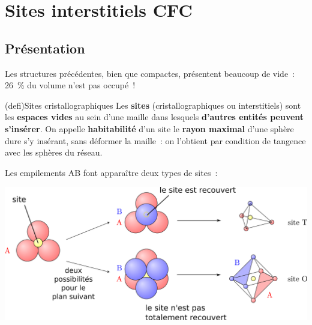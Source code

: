 \documentclass[../../main/main.tex]{subfiles}
\begin{document}
\section{Sites interstitiels CFC}
\subsection{Présentation}
Les structures précédentes, bien que compactes, présentent beaucoup de vide~:
\SI{26}{\%} du volume n'est pas occupé~!
\begin{tcb*}(defi){Sites cristallographiques}
	Les \textbf{sites} (cristallographiques ou interstitiels) sont les
	\textbf{espaces vides} au sein d'une maille dans lesquels \textbf{d'autres
		entités peuvent s'insérer}.
	\smallbreak
	On appelle \textbf{habitabilité} d'un site le \textbf{rayon maximal} d'une
	sphère dure s'y insérant, sans déformer la maille~: on l'obtient par condition
	de tangence avec les sphères du réseau.
\end{tcb*}

Les empilements AB font apparaître deux types de sites~:
\begin{center}
	\includegraphics[scale=1]{sites_pres}
\end{center}
\end{document}
